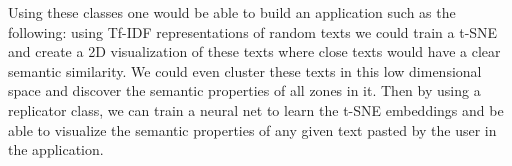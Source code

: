 \documentclass[a4paper,11pt,spanish]{report}
\begin{document}
Using these classes one would be able to build an application such as the following: using Tf-IDF representations of random texts we could train a t-SNE and create a 2D visualization of these texts where close texts would have a clear semantic similarity. We could even cluster these texts in this low dimensional space and discover the semantic properties of all zones in it. Then by using a replicator class, we can train a neural net to learn the t-SNE embeddings and be able to visualize the semantic properties of any given text pasted by the user in the application.

\inputminted[baselinestretch=1, fontsize=\scriptsize, breaklines]{python}{classes.py}



\label{chap:bib}

\nocite{*}

% 


\end{document}
